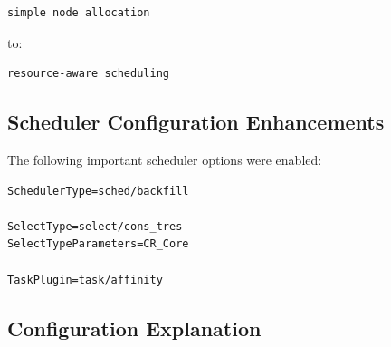 \documentclass[11pt]{article}
\begin{document}
\begin{verbatim}
simple node allocation
\end{verbatim}

to:

\begin{verbatim}
resource-aware scheduling
\end{verbatim}
\subsection{Scheduler Configuration Enhancements}
\label{sec:orgbe700c6}

The following important scheduler options were enabled:

\begin{verbatim}
SchedulerType=sched/backfill

SelectType=select/cons_tres
SelectTypeParameters=CR_Core

TaskPlugin=task/affinity
\end{verbatim}
\subsection{Configuration Explanation}
\label{sec:orga92de16}
\end{document}
